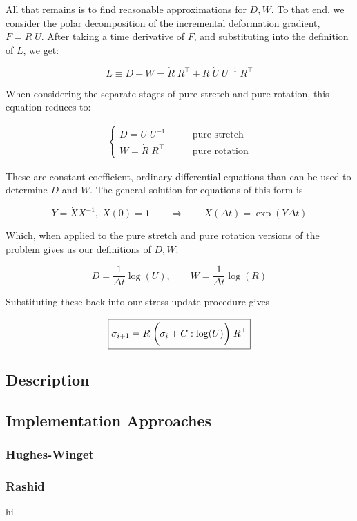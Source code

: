 All that remains is to find reasonable approximations for $D, W$. To that end, we
consider the polar decomposition of the incremental deformation gradient, 
$F = R \; U$. After taking a time derivative of $F$, and substituting into the
definition of $L$, we get:

$$ L \equiv D + W = \dot{R} \; R^\top + R \; \dot{U} \; U^{-1} \; R^\top $$

When considering the separate stages of pure stretch and pure rotation, this
equation reduces to:

\begin{align*}
\begin{cases}
D = \dot{U} \; U^{-1} & \qquad \text{pure stretch} \\
W = \dot{R} \; R^\top & \qquad \text{pure rotation}
\end{cases}
\end{align*}

These are constant-coefficient, ordinary differential equations
than can be used to determine $D$ and $W$. The
general solution for equations of this form is

$$ 
Y = \dot{X} X^{-1}, \; X(0) = \mathbf{1} 
\qquad 
\Longrightarrow 
\qquad 
X(\Delta t) = \exp(Y \Delta t)
$$

Which, when applied to the pure stretch and pure rotation versions of the problem
gives us our definitions of $D, W$:

$$ D = \frac{1}{\Delta t} \log(U), \qquad W = \frac{1}{\Delta t} \log(R) $$

Substituting these back into our stress update procedure gives 

$$\boxed{\sigma_{i+1} = R \; \displaystyle \bigg( \sigma_i + C : \log(U) \bigg) \; R^\top}$$




\subsection{Description}
\label{Description}

\subsection{Implementation Approaches}
\label{Implementation Approaches}
\subsubsection{Hughes-Winget}
\label{Hughes-Winget}

\subsubsection{Rashid}
\label{Rashid}

hi
